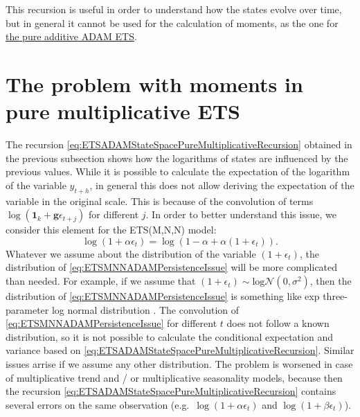 \documentclass[
]{book}
\theoremstyle{definition}
\theoremstyle{definition}
\theoremstyle{definition}
\theoremstyle{definition}
\theoremstyle{remark}
\begin{document}
This recursion is useful in order to understand how the states evolve over time, but in general it cannot be used for the calculation of moments, as the one for \protect\hyperlink{adamETSPureAdditiveRecursive}{the pure additive ADAM ETS}.

\hypertarget{pureMultiplicativeExpectationAndVariance}{%
\section{The problem with moments in pure multiplicative ETS}\label{pureMultiplicativeExpectationAndVariance}}

The recursion \eqref{eq:ETSADAMStateSpacePureMultiplicativeRecursion} obtained in the previous subsection shows how the logarithms of states are influenced by the previous values. While it is possible to calculate the expectation of the logarithm of the variable \(y_{t+h}\), in general this does not allow deriving the expectation of the variable in the original scale. This is because of the convolution of terms \(\log(\mathbf{1}_k + \mathbf{g} \epsilon_{t+j})\) for different \(j\). In order to better understand this issue, we consider this element for the ETS(M,N,N) model:
\begin{equation}
    \log(1+\alpha\epsilon_t) = \log(1-\alpha + \alpha(1+\epsilon_t)).
  \label{eq:ETSMNNADAMPersistenceIssue}
\end{equation}
Whatever we assume about the distribution of the variable \((1+\epsilon_t)\), the distribution of \eqref{eq:ETSMNNADAMPersistenceIssue} will be more complicated than needed. For example, if we assume that \((1+\epsilon_t)\sim\mathrm{log}\mathcal{N}(0,\sigma^2)\), then the distribution of \eqref{eq:ETSMNNADAMPersistenceIssue} is something like exp three-parameter log normal distribution \citep{Sangal1970}. The convolution of \eqref{eq:ETSMNNADAMPersistenceIssue} for different \(t\) does not follow a known distribution, so it is not possible to calculate the conditional expectation and variance based on \eqref{eq:ETSADAMStateSpacePureMultiplicativeRecursion}. Similar issues arrise if we assume any other distribution. The problem is worsened in case of multiplicative trend and / or multiplicative seasonality models, because then the recursion \eqref{eq:ETSADAMStateSpacePureMultiplicativeRecursion} contains several errors on the same observation (e.g.~\(\log(1+\alpha\epsilon_t)\) and \(\log(1+\beta\epsilon_t)\)).
\end{document}
